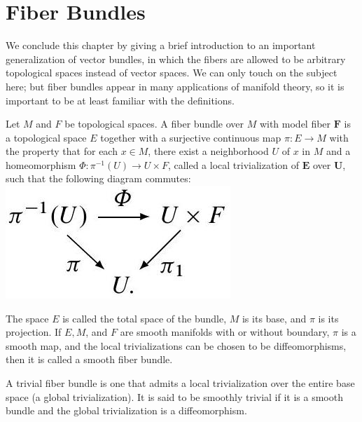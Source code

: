 \documentclass[10pt, letterpaper]{article}
\begin{document}
\section*{Fiber Bundles}
We conclude this chapter by giving a brief introduction to an important generalization of vector bundles, in which the fibers are allowed to be arbitrary topological spaces instead of vector spaces. We can only touch on the subject here; but fiber bundles appear in many applications of manifold theory, so it is important to be at least familiar with the definitions.

Let $M$ and $F$ be topological spaces. A fiber bundle over $M$ with model fiber $\boldsymbol{F}$ is a topological space $E$ together with a surjective continuous map $\pi: E \rightarrow M$ with the property that for each $x \in M$, there exist a neighborhood $U$ of $x$ in $M$ and a homeomorphism $\Phi: \pi^{-1}(U) \rightarrow U \times F$, called a local trivialization of $\boldsymbol{E}$ over $\boldsymbol{U}$, such that the following diagram commutes:\\
\includegraphics[scale=0.2, center]{2025_06_03_90f64b1a1e243cccc2e0g-286}

The space $E$ is called the total space of the bundle, $M$ is its base, and $\pi$ is its projection. If $E, M$, and $F$ are smooth manifolds with or without boundary, $\pi$ is a smooth map, and the local trivializations can be chosen to be diffeomorphisms, then it is called a smooth fiber bundle.

A trivial fiber bundle is one that admits a local trivialization over the entire base space (a global trivialization). It is said to be smoothly trivial if it is a smooth bundle and the global trivialization is a diffeomorphism.
\end{document}
